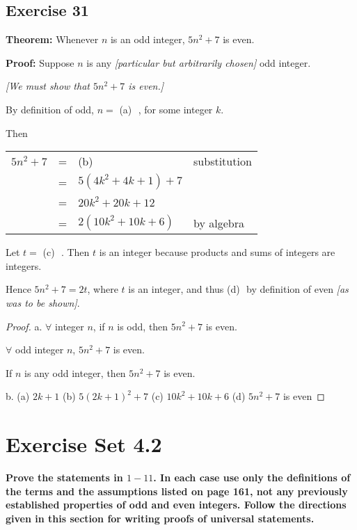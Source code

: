 \documentclass[14pt]{extarticle}
\newcommand{\fbl}{\underline{\hspace{1cm}}\,\,}
\newcommand{\fa}{\forall}
\newcommand{\cy}{\color{cyan}}
\begin{document}
\subsection{Exercise 31}
{\bf Theorem:} Whenever $n$ is an odd integer, $5n^2 + 7$ is even.

    {\bf Proof:} Suppose $n$ is any {\it [particular but arbitrarily chosen]} odd integer.

    {\it [We must show that $5n^2 + 7$ is even.]}

By definition of odd, $n = $ {\cy (a)} \fbl, for some integer $k$.

Then

\begin{center}
    \begin{tabular}{rcll}
        $5n^2 + 7$ & = & {\cy (b)} \fbl         & \cy substitution \\
                   & = & $5(4k^2 + 4k + 1) + 7$ &                  \\
                   & = & $20k^2 + 20k + 12$     &                  \\
                   & = & $2(10k^2 + 10k + 6)$   & \cy by algebra   \\
    \end{tabular}
\end{center}

Let $t = $ {\cy (c)} \fbl. Then $t$ is an integer because products and sums of integers are integers.

Hence $5n^2 + 7 = 2t$, where $t$ is an integer, and thus {\cy (d)} \fbl by definition of even {\it [as was to be shown]}.

\begin{proof}
    a. $\fa$ integer $n$, if $n$ is odd, then $5n^2+7$ is even.

    $\fa$ odd integer $n$, $5n^2+7$ is even.

    If $n$ is any odd integer, then $5n^2+7$ is even.

    b. (a) $2k+1$ (b) $5(2k+1)^2 + 7$ (c) $10k^2 + 10k + 6$ (d) $5n^2+7$ is even
\end{proof}

\section{Exercise Set 4.2}

 {\bf \cy Prove the statements in $1-11$. In each case use only the definitions of the terms and the assumptions listed on page 161, not any previously established properties of odd and even integers. Follow the directions given in this section for writing proofs of universal statements.}
\end{document}
